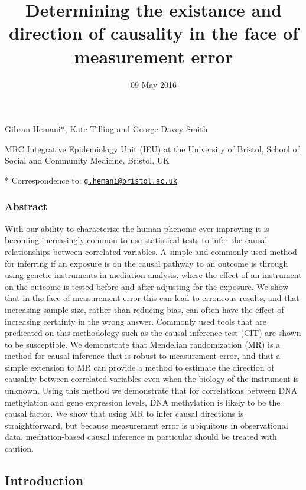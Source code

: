 \documentclass[]{article}
\title{Determining the existance and direction of causality in the face of
measurement error}
\author{}
\date{09 May 2016}
\begin{document}
\maketitle


Gibran Hemani*, Kate Tilling and George Davey Smith

MRC Integrative Epidemiology Unit (IEU) at the University of Bristol,
School of Social and Community Medicine, Bristol, UK

* Correspondence to:
\href{mailto:g.hemani@bristol.ac.uk}{\nolinkurl{g.hemani@bristol.ac.uk}}

\subsubsection{Abstract}\label{abstract}

With our ability to characterize the human phenome ever improving it is
becoming increasingly common to use statistical tests to infer the
causal relationships between correlated variables. A simple and commonly
used method for inferring if an exposure is on the causal pathway to an
outcome is through using genetic instruments in mediation analysis,
where the effect of an instrument on the outcome is tested before and
after adjusting for the exposure. We show that in the face of
measurement error this can lead to erroneous results, and that
increasing sample size, rather than reducing bias, can often have the
effect of increasing certainty in the wrong answer. Commonly used tools
that are predicated on this methodology such as the causal inference
test (CIT) are shown to be susceptible. We demonstrate that Mendelian
randomization (MR) is a method for causal inference that is robust to
measurement error, and that a simple extension to MR can provide a
method to estimate the direction of causality between correlated
variables even when the biology of the instrument is unknown. Using this
method we demonstrate that for correlations between DNA methylation and
gene expression levels, DNA methylation is likely to be the causal
factor. We show that using MR to infer causal directions is
straightforward, but because measurement error is ubiquitous in
observational data, mediation-based causal inference in particular
should be treated with caution.

\subsection{Introduction}\label{introduction}
\end{document}
